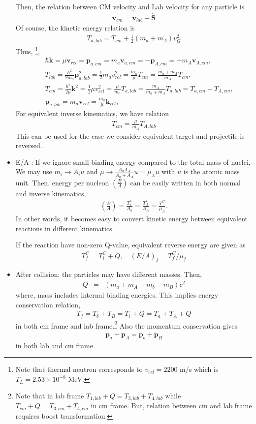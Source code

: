 \documentclass[10pt]{book}
\def\bm{\boldsymbol}
\newcommand{\bea}{\begin{eqnarray}}
\newcommand{\eea}{\end{eqnarray}}
\newcommand{\no}{\nonumber \\}
\def\vp{{\bm p}}
\def\vk{{\bm k}}
\begin{document}
\begin{itemize}
Then, the relation between CM velocity and Lab velocity for any particle is
\bea 
{\bm v}_{cm}={\bm v}_{lab}-\dot{\bm S}
\eea 
Of course, the kinetic energy relation is  
\bea 
T_{a,lab}=T_{cm}+\frac{1}{2}(m_a+m_A)v_G^2
\eea 
Thus, 
\footnote{ 
Note that thermal neutron corresponds to $v_{rel}=2200$ m/s which is 
$T_L=2.53\times 10^{-8}$ MeV.},
\bea
& & \hbar\vk=\mu{\bm v}_{rel}
 ={\bm p}_{a,cm}=m_a{\bm v}_{a,cm}=-{\bm p}_{A,cm}=-m_A{\bm v}_{A,cm},
\no 
& &T_{lab}=\frac{\hbar^2}{2m_a}\vp^2_{a,lab}=\frac{1}{2}m_a v_{rel}^2
 =\frac{m_a}{\mu}T_{cm} =\frac{m_a+m_A}{m_A} T_{cm}, \no 
& & T_{cm}=\frac{\hbar^2}{2\mu}\vk^2=\frac{1}{2}\mu v_{rel}^2=
\frac{\mu}{m_a} T_{a,lab} =\frac{m_A}{m_a+m_A} T_{a,lab} =T_{a,cm}+T_{A,cm}, \no
& &{\vp}_{a,lab}=m_a{\bm v}_{rel}=\frac{m_a}{\mu}\vk_{rel} ,
\eea
For equivalent inverse kinematics, we have relation
\bea 
T_{cm}=\frac{\mu}{m_A} T_{A,lab}
\eea 
This can be used for the case we consider equivalent target and projectile is reversed. 

\item E/A : 
If we ignore small binding energy compared to the total mass of nuclei,
We may use $m_i\to A_i u$ and $\mu\to \frac{A_a A_A}{A_a+A_A}u=\mu_A u$
with $u$ is the atomic mass unit. Then, energy per nucleon $\left(\frac{E}{A}\right)$
can be easily written in both normal and inverse kinematics, 
\bea 
\left(\frac{E}{A}\right)=\frac{T_a^L}{A_a}=\frac{T_A^L}{A_A}=\frac{T^C}{\mu_A}.   
\eea 
In other words, it becomes easy to convert kinetic energy 
between equivalent reactions in different kinematics. 

If the reaction have non-zero Q-value, equivalent reverse energy 
are given as
\bea 
T_f^{C}=T_i^{C}+Q,\quad (E/A)_f=T_f^{C}/\mu_f
\eea 

\item After collision: the particles may have different masses. Then,
\bea 
Q&=&(m_a+m_A-m_b-m_B)c^2
\eea 
where, mass includes internal binding energies. 
This implies energy conservation relation,
\bea 
T_{f}=T_b+T_B=T_i+Q=T_a+T_A+Q
\eea 
in both cm frame and lab frame.\footnote{
Note that in lab frame $T_{1,lab}+Q=T_{3,lab}+T_{4,lab}$ 
while $T_{cm}+Q=T_{3,cm}+T_{4,cm}$ in cm frame. But, relation between 
cm and lab frame requires boost transformation. 
}  
Also the momentum conservation gives
\bea 
\vp_a+\vp_A=\vp_b+\vp_B 
\eea 
in both lab and cm frame. 


\end{itemize}
\end{document}
